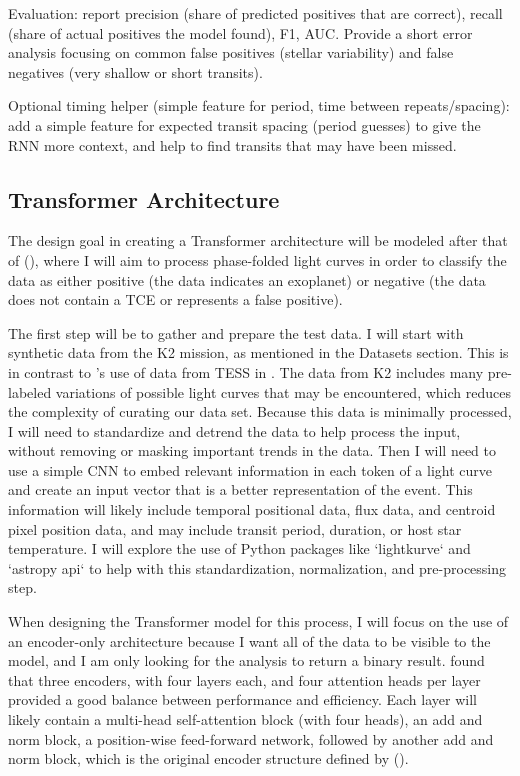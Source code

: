 \documentclass[letterpaper]{article} %
\begin{document}
{Evaluation: report precision (share of predicted positives that are correct), recall (share of actual positives the model found), F1, AUC. Provide a short error analysis focusing on common false positives (stellar variability) and false negatives (very shallow or short transits).

Optional timing helper (simple feature for period, time between repeats/spacing): add a simple feature for expected transit spacing (period guesses) to give the RNN more context, and help to find transits that may have been missed.

\subsection{Transformer Architecture}

The design goal in creating a Transformer architecture will be modeled after that of \citeauthor{salinas2023distinguishingtransitfalsepositives} (\citeyear{salinas2023distinguishingtransitfalsepositives}), where I will aim to process phase-folded light curves in order to classify the data as either positive (the data indicates an exoplanet) or negative (the data does not contain a TCE or represents a false positive). 

The first step will be to gather and prepare the test data. I will start with synthetic data from the K2 mission, as mentioned in the Datasets section. This is in contrast to \citeauthor{salinas2023distinguishingtransitfalsepositives}'s use of data from TESS in \citeyear{salinas2023distinguishingtransitfalsepositives}. The data from K2 includes many pre-labeled variations of possible light curves that may be encountered, which reduces the complexity of curating our data set. Because this data is minimally processed, I will need to standardize and detrend the data to help process the input, without removing or masking important trends in the data. Then I will need to use a simple CNN to embed relevant information in each token of a light curve and create an input vector that is a better representation of the event. This information will likely include temporal positional data, flux data, and centroid pixel position data, and may include transit period, duration, or host star temperature. I will explore the use of Python packages like ‘lightkurve‘ and ‘astropy api‘ to help with this standardization, normalization, and pre-processing step.

When designing the Transformer model for this process, I will focus on the use of an encoder-only architecture because I want all of the data to be visible to the model, and I am only looking for the analysis to return a binary result. \citeauthor{salinas2023distinguishingtransitfalsepositives} found that three encoders, with four layers each, and four attention heads per layer provided a good balance between performance and efficiency. Each layer will likely contain a multi-head self-attention block (with four heads), an add and norm block, a position-wise feed-forward network, followed by another add and norm block, which is the original encoder structure defined by \citeauthor{vaswani2017attentionneed} (\citeyear{vaswani2017attentionneed}). 

}
\end{document}
